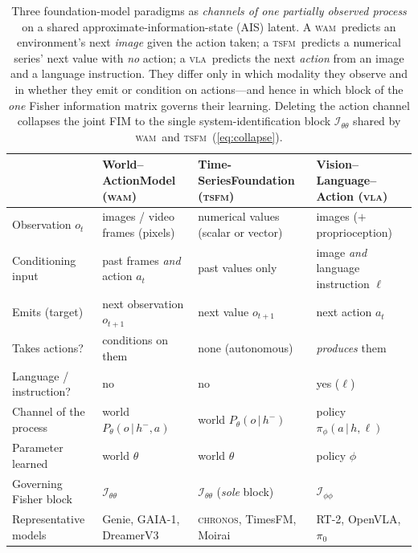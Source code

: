 \documentclass[10pt]{article}
\theoremstyle{plain}
\theoremstyle{definition}
\theoremstyle{remark}
\newcommand{\Fisher}{\mathcal{I}}
\newcommand{\Ith}{\Fisher_{\theta\theta}}
\newcommand{\Iph}{\Fisher_{\phi\phi}}
\newcommand{\given}{\,\vert\,}
\newcommand{\wm}{P_{\theta}}
\newcommand{\TSFM}{\textsc{tsfm}}
\newcommand{\WAM}{\textsc{wam}}
\newcommand{\VLA}{\textsc{vla}}
\newcommand{\Chronos}{\textsc{chronos}}
\begin{document}
\begin{table}[t]
\centering
\small
\setlength{\tabcolsep}{5pt}
\renewcommand{\arraystretch}{1.28}
\caption{Three foundation-model paradigms as \emph{channels of one partially
observed process} on a shared approximate-information-state (AIS) latent. A
\WAM\ predicts an environment's next \emph{image} given the action taken; a
\TSFM\ predicts a numerical series' next value with \emph{no} action; a \VLA\
predicts the next \emph{action} from an image and a language instruction. They
differ only in which modality they observe and in whether they emit or condition
on actions---and hence in which block of the \emph{one} Fisher information matrix
governs their learning. Deleting the action channel collapses the joint FIM to
the single system-identification block $\Ith$ shared by \WAM\ and \TSFM\
(\cref{eq:collapse}).}
\label{tab:paradigms}
\begin{tabular}{@{}p{2.65cm}p{3.72cm}p{3.72cm}p{3.72cm}@{}}
\toprule
 & \textbf{World--Action}\newline\textbf{Model} (\WAM)
 & \textbf{Time-Series}\newline\textbf{Foundation} (\TSFM)
 & \textbf{Vision--Language}\newline\textbf{--Action} (\VLA)\\
\midrule
Observation $o_t$
 & images / video frames (pixels)
 & numerical values (scalar or vector)
 & images ($+$ proprioception) \\
Conditioning input
 & past frames \emph{and} action $a_t$
 & past values only
 & image \emph{and} language instruction $\ell$ \\
Emits (target)
 & next observation $o_{t+1}$
 & next value $o_{t+1}$
 & next action $a_t$ \\
Takes actions?
 & conditions on them
 & none (autonomous)
 & \emph{produces} them \\
Language / instruction?
 & no
 & no
 & yes ($\ell$) \\
Channel of the process
 & world $\wm(o\given h^-,a)$
 & world $\wm(o\given h^-)$
 & policy $\pi_\phi(a\given h,\ell)$ \\
Parameter learned
 & world $\theta$
 & world $\theta$
 & policy $\phi$ \\
Governing Fisher block
 & $\Ith$
 & $\Ith$ (\emph{sole} block)
 & $\Iph$ \\
Representative models
 & Genie, GAIA-1, DreamerV3
 & \Chronos, TimesFM, Moirai
 & RT-2, OpenVLA, $\pi_0$ \\
\bottomrule
\end{tabular}
\end{table}
\end{document}
